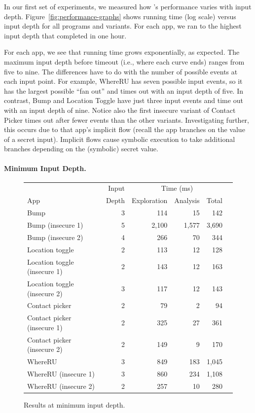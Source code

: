 In our first set of experiments, we measured how
\toolname{}'s performance varies with input
depth. Figure~\ref{fig:performance-graphs} shows running time (log scale)
versus input depth for all programs and variants.
For each app, we ran to the highest input depth that completed in
one hour.

For each app, we see that running time
grows exponentially, as expected. The maximum input depth
before timeout (i.e., where each curve ends) ranges from five to
nine. The differences have to do with the number of possible events at
each input point. For example, WhereRU has seven possible input events, so
it has the largest possible ``fan out'' and times out with an input
depth of five. In contrast, Bump and Location Toggle have just three
input events and time out with an input depth of nine. Notice also the first
insecure variant of Contact Picker times out after fewer events than
the other variants. Investigating further, this occurs due to
that app's implicit flow (recall the app branches on the value of a
secret input). Implicit flows cause symbolic execution to take
additional branches depending on the (symbolic) secret value.

\paragraph*{Minimum Input Depth.}

\begin{figure}[t]
  \centering
  \begin{tabular}{ | l | r | r | r | r | r | }
    \hline
    &Input&\multicolumn{3}{c|}{Time (ms)} \\ \cline{3-5}
    App & Depth & Exploration & Analysis & Total \\ \hline
    \hline
    Bump & 3 & 114 &  15 & 142 \\
    Bump (insecure 1) & 5 & 2,100 & 1,577 & 3,690 \\
    Bump (insecure 2) & 4 & 266 & 70 & 344 \\\hline
    Location toggle & 2 &  113 & 12 & 128 \\
    Location toggle (insecure 1) & 2 &  143 & 12 & 163 \\
    Location toggle (insecure 2) & 3 & 117 & 12 & 143 \\\hline
    Contact picker & 2 &  79 & 2 & 94 \\
    Contact picker (insecure 1) & 2 &  325 & 27 & 361 \\
    Contact picker (insecure 2) & 2 &  149 & 9 & 170 \\\hline
    WhereRU & 3 & 849 & 183 & 1,045 \\
    WhereRU (insecure 1) & 3 & 860 & 234 & 1,108 \\
    WhereRU (insecure 2) & 2 & 257 & 10 & 280 \\
    \hline
  \end{tabular}
  \caption{Results at minimum input depth.}
  \label{fig:results}
\end{figure}

